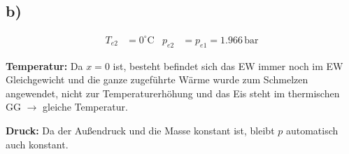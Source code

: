 

\subsection*{b)}
\begin{align*}
T_{e2} &= 0^\circ \text{C} & p_{e2} &= p_{e1} = 1.966 \, \text{bar}
\end{align*}

\textbf{Temperatur:} Da $x = 0$ ist, besteht befindet sich das EW immer noch im EW Gleichgewicht und die ganze zugeführte Wärme wurde zum Schmelzen angewendet, nicht zur Temperaturerhöhung und das Eis steht im thermischen GG $\rightarrow$ gleiche Temperatur.

\textbf{Druck:} Da der Außendruck und die Masse konstant ist, bleibt $p$ automatisch auch konstant.